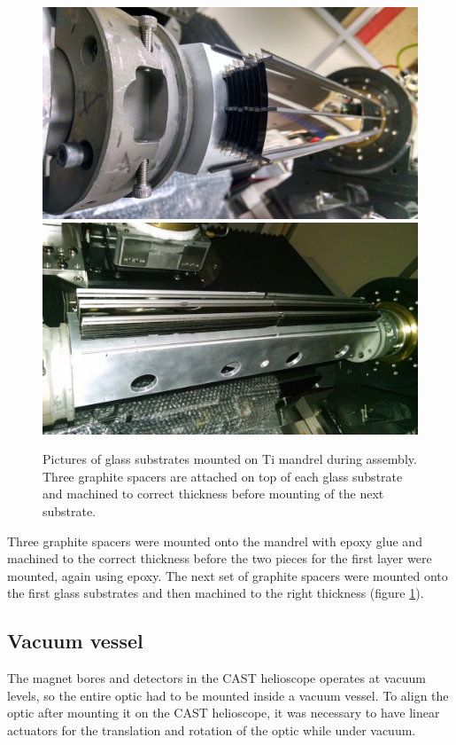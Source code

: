 \begin{figure}[htbp]
  \centering
  \includegraphics[width=0.45\linewidth]{figures/cast/assembly1.jpg}
  \includegraphics[width=0.45\linewidth]{figures/cast/assembly2.jpg}
  \caption{\footnotesize Pictures of glass substrates mounted on Ti mandrel during assembly. Three graphite spacers are attached on top of each glass substrate and machined to correct thickness before mounting of the next substrate.}
  \label{fig:cast_assembly}
\end{figure}

Three graphite spacers were mounted onto the mandrel with epoxy glue and machined to the correct thickness before the two pieces for the first layer were mounted, again using epoxy. The next set of graphite spacers were mounted onto the first glass substrates and then machined to the right thickness (figure \ref{fig:cast_assembly}).

\subsection{Vacuum vessel}
The magnet bores and detectors in the CAST helioscope operates at vacuum levels, so the entire optic had to be mounted inside a vacuum vessel. To align the optic after mounting it on the CAST helioscope, it was necessary to have linear actuators for the translation and rotation of the optic while under vacuum.

